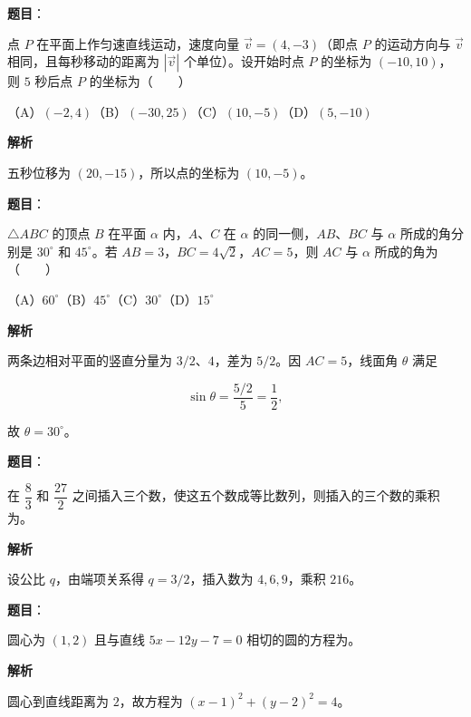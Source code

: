 \begin{answer}

\textbf{题目}：

点 $P$ 在平面上作匀速直线运动，速度向量 $\vec v=(4,-3)$（即点 $P$ 的运动方向与 $\vec v$ 相同，且每秒移动的距离为 $|\vec v|$ 个单位）。设开始时点 $P$ 的坐标为 $(-10,10)$，则 $5$ 秒后点 $P$ 的坐标为\mbox{（　　）}

（A）$(-2,4)$\quad（B）$(-30,25)$\quad（C）$(10,-5)$\quad（D）$(5,-10)$

\textbf{解析}

五秒位移为 $(20,-15)$，所以点的坐标为 $(10,-5)$。


\end{answer}
\begin{answer}

\textbf{题目}：

$\triangle ABC$ 的顶点 $B$ 在平面 $\alpha$ 内，$A\text{、}C$ 在 $\alpha$ 的同一侧，$AB\text{、}BC$ 与 $\alpha$ 所成的角分别是 $30^\circ$ 和 $45^\circ$。若 $AB=3$，$BC=4\sqrt2$，$AC=5$，则 $AC$ 与 $\alpha$ 所成的角为\mbox{（　　）}

（A）$60^\circ$\quad（B）$45^\circ$\quad（C）$30^\circ$\quad（D）$15^\circ$

\textbf{解析}

两条边相对平面的竖直分量为 $3/2$、$4$，差为 $5/2$。因 $AC=5$，线面角 $\theta$ 满足

\nopagebreak[4]
\[
\sin\theta=\frac{5/2}{5}=\frac12,
\]

故 $\theta=30^\circ$。


\end{answer}
\begin{answer}

\textbf{题目}：

在 $\dfrac83$ 和 $\dfrac{27}{2}$ 之间插入三个数，使这五个数成等比数列，则插入的三个数的乘积为\gkblank{}。

\textbf{解析}

设公比 $q$，由端项关系得 $q=3/2$，插入数为 $4,6,9$，乘积 $216$。


\end{answer}
\begin{answer}

\textbf{题目}：

圆心为 $(1,2)$ 且与直线 $5x-12y-7=0$ 相切的圆的方程为\gkblank{}。

\textbf{解析}

圆心到直线距离为 $2$，故方程为 $(x-1)^2+(y-2)^2=4$。


\end{answer}
